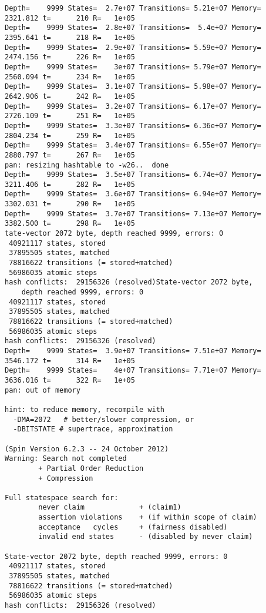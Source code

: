\documentclass{llncs}
\begin{document}
\begin{lstlisting}[frame=single]
Depth=    9999 States=  2.7e+07 Transitions= 5.21e+07 Memory=  2321.812 t=      210 R=   1e+05
Depth=    9999 States=  2.8e+07 Transitions=  5.4e+07 Memory=  2395.641 t=      218 R=   1e+05
Depth=    9999 States=  2.9e+07 Transitions= 5.59e+07 Memory=  2474.156 t=      226 R=   1e+05
Depth=    9999 States=    3e+07 Transitions= 5.79e+07 Memory=  2560.094 t=      234 R=   1e+05
Depth=    9999 States=  3.1e+07 Transitions= 5.98e+07 Memory=  2642.906 t=      242 R=   1e+05
Depth=    9999 States=  3.2e+07 Transitions= 6.17e+07 Memory=  2726.109 t=      251 R=   1e+05
Depth=    9999 States=  3.3e+07 Transitions= 6.36e+07 Memory=  2804.234 t=      259 R=   1e+05
Depth=    9999 States=  3.4e+07 Transitions= 6.55e+07 Memory=  2880.797 t=      267 R=   1e+05
pan: resizing hashtable to -w26..  done
Depth=    9999 States=  3.5e+07 Transitions= 6.74e+07 Memory=  3211.406 t=      282 R=   1e+05
Depth=    9999 States=  3.6e+07 Transitions= 6.94e+07 Memory=  3302.031 t=      290 R=   1e+05
Depth=    9999 States=  3.7e+07 Transitions= 7.13e+07 Memory=  3382.500 t=      298 R=   1e+05
tate-vector 2072 byte, depth reached 9999, errors: 0
 40921117 states, stored
 37895505 states, matched
 78816622 transitions (= stored+matched)
 56986035 atomic steps
hash conflicts:  29156326 (resolved)State-vector 2072 byte, 
    depth reached 9999, errors: 0
 40921117 states, stored
 37895505 states, matched
 78816622 transitions (= stored+matched)
 56986035 atomic steps
hash conflicts:  29156326 (resolved)
Depth=    9999 States=  3.9e+07 Transitions= 7.51e+07 Memory=  3546.172 t=      314 R=   1e+05
Depth=    9999 States=    4e+07 Transitions= 7.71e+07 Memory=  3636.016 t=      322 R=   1e+05
pan: out of memory

hint: to reduce memory, recompile with
  -DMA=2072   # better/slower compression, or
  -DBITSTATE # supertrace, approximation

(Spin Version 6.2.3 -- 24 October 2012)
Warning: Search not completed
        + Partial Order Reduction
        + Compression

Full statespace search for:
        never claim             + (claim1)
        assertion violations    + (if within scope of claim)
        acceptance   cycles     + (fairness disabled)
        invalid end states      - (disabled by never claim)

State-vector 2072 byte, depth reached 9999, errors: 0
 40921117 states, stored
 37895505 states, matched
 78816622 transitions (= stored+matched)
 56986035 atomic steps
hash conflicts:  29156326 (resolved)


\end{lstlisting}
\end{document}
